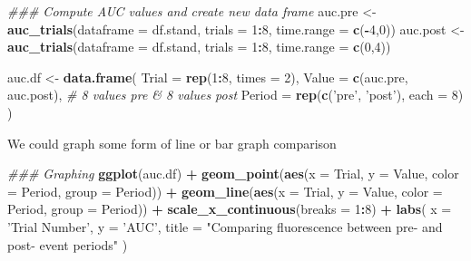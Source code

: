 \documentclass[
]{book}
\newenvironment{Shaded}{\begin{snugshade}}{\end{snugshade}}
\newcommand{\CommentTok}[1]{\textcolor[rgb]{0.56,0.35,0.01}{\textit{#1}}}
\newcommand{\DataTypeTok}[1]{\textcolor[rgb]{0.13,0.29,0.53}{#1}}
\newcommand{\DecValTok}[1]{\textcolor[rgb]{0.00,0.00,0.81}{#1}}
\newcommand{\KeywordTok}[1]{\textcolor[rgb]{0.13,0.29,0.53}{\textbf{#1}}}
\newcommand{\NormalTok}[1]{#1}
\newcommand{\OperatorTok}[1]{\textcolor[rgb]{0.81,0.36,0.00}{\textbf{#1}}}
\newcommand{\StringTok}[1]{\textcolor[rgb]{0.31,0.60,0.02}{#1}}
\begin{document}
\begin{Shaded}
\begin{Highlighting}[]
\CommentTok{### Compute AUC values and create new data frame}
\NormalTok{auc.pre <-}\StringTok{ }\KeywordTok{auc_trials}\NormalTok{(}\DataTypeTok{dataframe =}\NormalTok{ df.stand, }\DataTypeTok{trials =} \DecValTok{1}\OperatorTok{:}\DecValTok{8}\NormalTok{,}
                      \DataTypeTok{time.range =} \KeywordTok{c}\NormalTok{(}\OperatorTok{-}\DecValTok{4}\NormalTok{,}\DecValTok{0}\NormalTok{))}
\NormalTok{auc.post <-}\StringTok{ }\KeywordTok{auc_trials}\NormalTok{(}\DataTypeTok{dataframe =}\NormalTok{ df.stand, }\DataTypeTok{trials =} \DecValTok{1}\OperatorTok{:}\DecValTok{8}\NormalTok{,}
                      \DataTypeTok{time.range =} \KeywordTok{c}\NormalTok{(}\DecValTok{0}\NormalTok{,}\DecValTok{4}\NormalTok{))}

\NormalTok{auc.df <-}\StringTok{ }\KeywordTok{data.frame}\NormalTok{(}
  \DataTypeTok{Trial =} \KeywordTok{rep}\NormalTok{(}\DecValTok{1}\OperatorTok{:}\DecValTok{8}\NormalTok{, }\DataTypeTok{times =} \DecValTok{2}\NormalTok{),}
  \DataTypeTok{Value =} \KeywordTok{c}\NormalTok{(auc.pre, auc.post), }\CommentTok{# 8 values pre & 8 values post}
  \DataTypeTok{Period =} \KeywordTok{rep}\NormalTok{(}\KeywordTok{c}\NormalTok{(}\StringTok{'pre'}\NormalTok{, }\StringTok{'post'}\NormalTok{), }\DataTypeTok{each =} \DecValTok{8}\NormalTok{)}
\NormalTok{)}
\end{Highlighting}
\end{Shaded}

We could graph some form of line or bar graph comparison

\begin{Shaded}
\begin{Highlighting}[]
\CommentTok{### Graphing}
\KeywordTok{ggplot}\NormalTok{(auc.df) }\OperatorTok{+}
\StringTok{  }\KeywordTok{geom_point}\NormalTok{(}\KeywordTok{aes}\NormalTok{(}\DataTypeTok{x =}\NormalTok{ Trial, }\DataTypeTok{y =}\NormalTok{ Value,}
                 \DataTypeTok{color =}\NormalTok{ Period, }\DataTypeTok{group =}\NormalTok{ Period)) }\OperatorTok{+}
\StringTok{  }\KeywordTok{geom_line}\NormalTok{(}\KeywordTok{aes}\NormalTok{(}\DataTypeTok{x =}\NormalTok{ Trial, }\DataTypeTok{y =}\NormalTok{ Value,}
                \DataTypeTok{color =}\NormalTok{ Period, }\DataTypeTok{group =}\NormalTok{ Period)) }\OperatorTok{+}
\StringTok{  }\KeywordTok{scale_x_continuous}\NormalTok{(}\DataTypeTok{breaks =} \DecValTok{1}\OperatorTok{:}\DecValTok{8}\NormalTok{) }\OperatorTok{+}
\StringTok{  }\KeywordTok{labs}\NormalTok{(}
    \DataTypeTok{x =} \StringTok{'Trial Number'}\NormalTok{,}
    \DataTypeTok{y =} \StringTok{'AUC'}\NormalTok{,}
    \DataTypeTok{title =} \StringTok{"Comparing fluorescence between pre- and post- event periods"}
\NormalTok{  )}
\end{Highlighting}
\end{Shaded}
\end{document}
